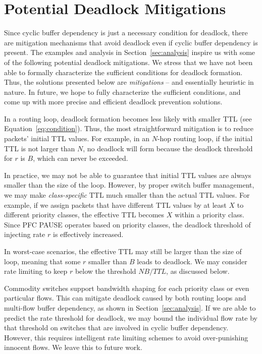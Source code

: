 \secspacelarge
\section{Potential Deadlock Mitigations}
\label{sec:mitigation}
\secspace

Since cyclic buffer dependency is just a necessary condition for deadlock, there
are mitigation mechanisms that avoid deadlock even if cyclic buffer dependency
is present.  The examples and analysis in Section~\ref{sec:analysis} inspire us
with some of the following potential deadlock mitigations.  We stress that we
have not been able to formally characterize the sufficient conditions for
deadlock formation. Thus, the solutions presented below are {\em mitigations} --
and essentially heuristic in nature. In future, we hope to fully characterize
the sufficient conditions, and come up with more precise and efficient deadlock
prevention solutions.

 In a routing loop,
deadlock formation becomes less likely with smaller TTL (see
Equation~\ref{eq:condition}).  Thus, the most straightforward mitigation is to
reduce packets' initial TTL values.  For example, in an $N$-hop routing loop, if
the initial TTL is not larger than $N$, no deadlock will form because the
deadlock threshold for $r$ is $B$, which can never be exceeded.

In practice, we may not be able to guarantee that initial TTL values are always
smaller than the size of the loop. However, by proper switch buffer management,
we may make {\em class-specific} TTL much smaller than the actual TTL values.
For example, if we assign packets that have different TTL values by at least $X$
to different priority classes, the effective TTL becomes $X$ within a priority
class. Since PFC PAUSE operates based on priority classes, the deadlock
threshold of injecting rate $r$ is effectively increased.

In worst-case scenarios, the effective TTL may still be larger than the size of
loop, meaning that some $r$ smaller than $B$ leads to deadlock. We may consider
rate limiting to keep $r$ below the threshold $NB/TTL$, as discussed below.

 Commodity switches support bandwidth shaping for each
priority class or even particular flows. This can mitigate deadlock caused by
both routing loops and multi-flow buffer dependency, as shown in
Section~\ref{sec:analysis}. If we are able to predict the rate threshold for
deadlock, we may bound the individual flow rate by that threshold on switches
that are involved in cyclic buffer dependency. However, this requires
intelligent rate limiting schemes to avoid over-punishing innocent flows. We
leave this to future work.

